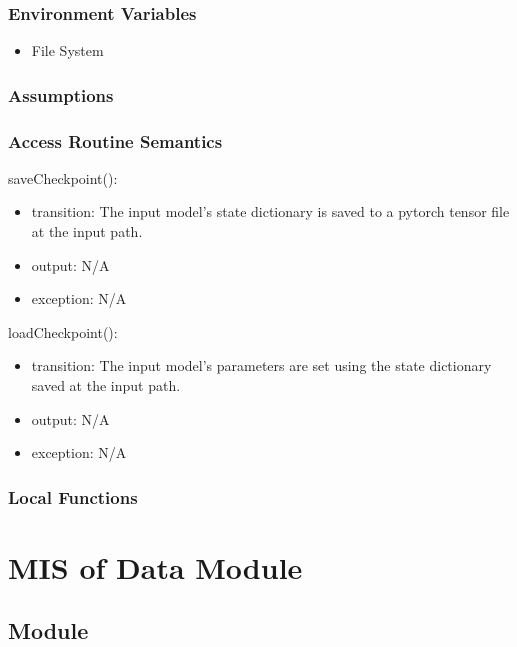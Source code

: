 \documentclass[12pt, titlepage]{article}
\begin{document}
\subsubsection{Environment Variables}

\begin{itemize}
  \item File System
\end{itemize}

\subsubsection{Assumptions}



\subsubsection{Access Routine Semantics}
\noindent saveCheckpoint():
\begin{itemize}
\item transition: The input model's state dictionary is saved to a pytorch tensor file at the input path. 
\item output: N/A
\item exception: N/A
\end{itemize}


\noindent loadCheckpoint():
\begin{itemize}
\item transition: The input model's parameters are set using the state dictionary saved at the input path.
\item output: N/A
\item exception: N/A
\end{itemize}


\subsubsection{Local Functions}

\newpage

\section{MIS of Data Module} \label{ModuleData} 

\subsection{Module}
\end{document}
